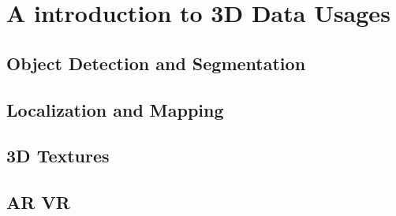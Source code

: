  

\chapter[Usages of 3D Data]{A introduction to 3D Data Usages}

\section{Object Detection and Segmentation}
\section{Localization and Mapping}
\section{3D Textures}
\section{AR VR}

